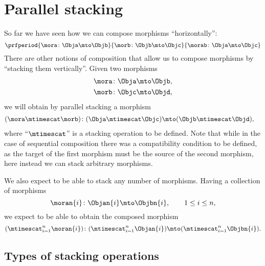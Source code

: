 
\section{Parallel stacking}
\label{sec:parallel-stacking}

So far we have seen how we can compose morphisms ``horizontally'':
%
\begin{equation}
    \prfperiod{
        \mora \colon \Obja \mto \Objb
    }{
        \morb\colon \Objb \mto \Objc
    }{
        \morab \colon \Obja \mto \Objc
    }
\end{equation}
%
There are other notions of composition that allow us to compose morphisms by ``stacking them vertically''.
Given two morphisms
%
\begin{align}
    \mora & \colon \Obja \mto \Objb, \\
    \morb & \colon \Objc \mto \Objd,
\end{align}
%
we will obtain by parallel stacking a morphism
%
\begin{align}
    (\mora\mtimescat \morb)
     & \colon (\Obja \mtimescat \Objc) \mto (\Objb \mtimescat \Objd),
\end{align}
%
where ``$\mtimescat$'' is a stacking operation to be defined.
Note that while in the case of sequential composition there was a compatibility condition to be defined, as the target of the first morphism must be the source of the second morphism, here instead we can stack arbitrary morphisms.

We also expect to be able to stack any number of morphisms.
Having a collection of morphisms
%
\begin{equation}
    \moran{i} \colon \Objan{i} \mto \Objbn{i}, \qquad 1 \leq i \leq n,
\end{equation}
%
we expect to be able to obtain the composed morphism
%
\begin{equation}
    (\mtimescat_{i=1}^n  \moran{i} )
    \colon( \mtimescat_{i=1}^n  \Objan{i} )\mto (\mtimescat_{i=1}^n  \Objbn{i}).
\end{equation}

\subsection{Types of stacking operations}

